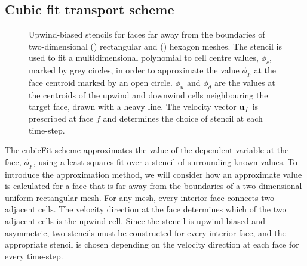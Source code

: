 \subsection{Cubic fit transport scheme}

\begin{figure}
	\centering
	\begin{subfigure}{\textwidth}
		\centering
		
		\label{fig:cubicFit:interiorStencils:quad}
		\label{fig:cubicFit:interiorStencils:hex}
	\end{subfigure}
	\caption{Upwind-biased stencils for faces far away from the boundaries of two-dimensional
	() rectangular and
	() hexagon meshes.
	The stencil is used to fit a multidimensional polynomial to cell centre values, $\phi_c$, marked by grey circles, in order to approximate the value $\phi_F$ at the face centroid marked by an open circle.  $\phi_u$ and $\phi_d$ are the values at the centroids of the upwind and downwind cells neighbouring the target face, drawn with a heavy line.  The velocity vector $\mathbf{u}_f$ is prescribed at face $f$ and determines the choice of stencil at each time-step.}
	\label{fig:cubicFit:interiorStencils}
\end{figure}

The cubicFit scheme approximates the value of the dependent variable at the face, $\phi_F$, using a least-squares fit over a stencil of surrounding known values.
To introduce the approximation method, we will consider how an approximate value is calculated for a face that is far away from the boundaries of a two-dimensional uniform rectangular mesh.
For any mesh, every interior face connects two adjacent cells.  The velocity direction at the face determines which of the two adjacent cells is the upwind cell.  Since the stencil is upwind-biased and asymmetric, two stencils must be constructed for every interior face, and the appropriate stencil is chosen depending on the velocity direction at each face for every time-step.

